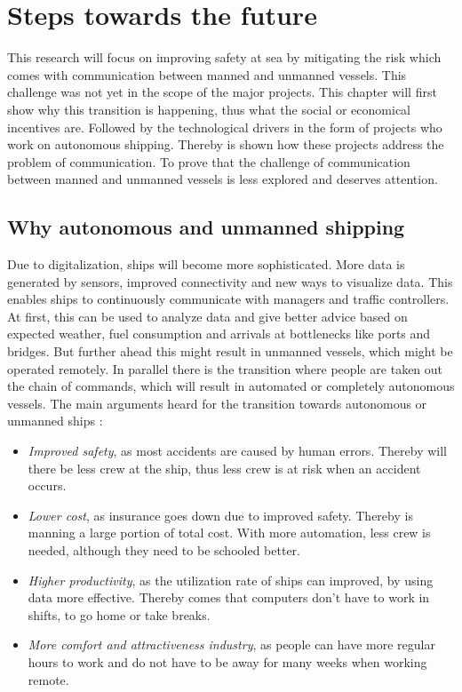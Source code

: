 \chapter{Steps towards the future}
\label{ch:future}
This research will focus on improving safety at sea by mitigating the risk which comes with communication between manned and unmanned vessels. This challenge was not yet in the scope of the major projects. This chapter will first show why this transition is happening, thus what the social or economical incentives are. Followed by the technological drivers in the form of projects who work on autonomous shipping. Thereby is shown how these projects address the problem of communication. To prove that the challenge of communication between manned and unmanned vessels is less explored and deserves attention.

\section{Why autonomous and unmanned shipping}
Due to digitalization, ships will become more sophisticated. More data is generated by sensors, improved connectivity and new ways to visualize data. This enables ships to continuously communicate with managers and traffic controllers. At first, this can be used to analyze data and give better advice based on expected weather, fuel consumption and arrivals at bottlenecks like ports and bridges.
But further ahead this might result in unmanned vessels, which might be operated remotely. In parallel there is the transition where people are taken out the chain of commands, which will result in automated or completely autonomous vessels. The main arguments heard for the transition towards autonomous or unmanned ships \cite{Saarni2018}:
\begin{itemize}
	\item \emph{Improved safety}, as most accidents are caused by human errors. Thereby will there be less crew at the ship, thus less crew is at risk when an accident occurs.
	\item \emph{Lower cost}, as insurance goes down due to improved safety. Thereby is manning a large portion of total cost. With more automation, less crew is needed, although they need to be schooled better.
	\item \emph{Higher productivity}, as the utilization rate of ships can improved, by using data more effective. Thereby comes that computers don't have to work in shifts, to go home or take breaks.
	\item \emph{More comfort and attractiveness industry}, as people can have more regular hours to work and do not have to be away for many weeks when working remote.
\end{itemize}
